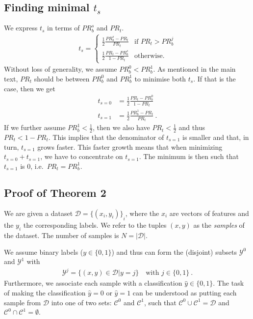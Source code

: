 \subsection{Finding minimal $t_s$}
We express $t_s$ in terms of $\mathit{PR}_b^s$ and $\mathit{PR}_t$.
\begin{align}
  t_s = \begin{cases}
    \frac{1}{2}\frac{\mathit{PR}_b^s - \mathit{PR}_t}{\mathit{PR}_t} &\text{if }\mathit{PR}_t>\mathit{PR}_b^j\\
    \frac{1}{2}\frac{\mathit{PR}_t - \mathit{PR}_b^s}{1 - \mathit{PR}_t} &\text{otherwise.}
  \end{cases}\label{eq:ts-pr2}
\end{align}
Without loss of generality, we assume $\mathit{PR}_b^0<\mathit{PR}_b^1$.
As mentioned in the main text, 
$\mathit{PR}_t$ should be between $\mathit{PR}_b^0$ and $\mathit{PR}_b^1$ to minimise both $t_s$.
If that is the case, then we get
\begin{align}
  t_{s=0} &= \frac{1}{2}\frac{\mathit{PR}_t - \mathit{PR}_b^0}{1 - \mathit{PR}_t}\\
  t_{s=1} &= \frac{1}{2}\frac{\mathit{PR}_b^1 - \mathit{PR}_t}{\mathit{PR}_t}~.
\end{align}
If we further assume $\mathit{PR}_b^1<\tfrac{1}{2}$,
then we also have $\mathit{PR}_t<\tfrac{1}{2}$ and thus $\mathit{PR}_t<1-\mathit{PR}_t$.
This implies that the denominator of $t_{s=1}$ is smaller and that, in turn, $t_{s=1}$ grows faster.
This faster growth means that when minimizing $t_{s=0} + t_{s=1}$, we have to concentrate on $t_{s=1}$.
The minimum is then such that $t_{s=1}$ is 0, i.e.\ $\mathit{PR}_t=\mathit{PR}_b^1$.

\subsection{Proof of Theorem 2}
We are given a dataset $\mathcal{D} = {\{(x_i, y_i)\}}_i$,
where the $x_i$ are vectors of features and the $y_i$ the corresponding labels.
We refer to the tuples $(x, y)$ as the \emph{samples} of the dataset.
The number of samples is $N = |\mathcal{D}|$.

We assume binary labels ($y\in \{0, 1\}$) and thus can form the (disjoint) subsets $\mathcal{\mathcal{Y}}^0$ and $\mathcal{Y}^1$ with
\begin{align}
  \mathcal{Y}^j = \{(x, y)\in \mathcal{D}|y = j\}\quad\text{with } j\in\{0, 1\}~.
\end{align}
Furthermore, we associate each sample with a classification $\hat{y}\in \{0, 1\}$.
The task of making the classification $\hat{y}=0$ or $\hat{y}=1$ can be understood as putting each sample from $\mathcal{D}$
into one of two sets: $\mathcal{C}^0$ and $\mathcal{C}^1$,
such that $\mathcal{C}^0\cup\mathcal{C}^1 = \mathcal{D}$ and $\mathcal{C}^0\cap\mathcal{C}^1 = \emptyset$.

